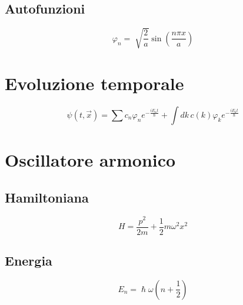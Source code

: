 \documentclass[a4paper,11pt]{report}
\theoremstyle{remark}
\theoremstyle{definition}
\begin{document}
\subsection{Autofunzioni}
\begin{equation*}
    \varphi_n = \sqrt[]{\frac{2}{a}}\sin\left(\frac{n\pi x}{a}\right)
\end{equation*}

\section{Evoluzione temporale}
\begin{equation*}
    \psi(t,\vec{x}) = \sum c_n\varphi_n e^{-\frac{iE_nt}{\hslash}} + \int dk \, c(k)\varphi_ke^{-\frac{iE_kt}{\hslash}}
\end{equation*}

\section{Oscillatore armonico}
\subsection{Hamiltoniana}
\begin{equation*}
    H = \frac{p^2}{2m} + \frac{1}{2}m\omega^2x^2
\end{equation*}

\subsection{Energia}
\begin{equation*}
    E_n = \hslash\omega \left(n + \frac{1}{2}\right)
\end{equation*}
\end{document}
